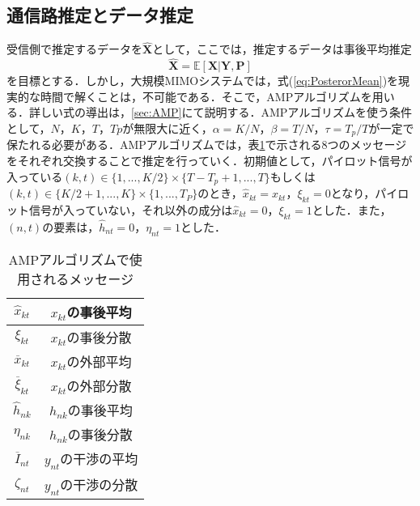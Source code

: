 \subsection{通信路推定とデータ推定}
受信側で推定するデータを$\hat{\boldsymbol{X}}$として，ここでは，推定するデータは事後平均推定
\begin{equation} 
	\label{eq:PosterorMean}
	\hat{\boldsymbol{X}}=\mathbb{E}[\boldsymbol{X}|\boldsymbol{Y},\boldsymbol{P}]
\end{equation}	
を目標とする．しかし，大規模MIMOシステムでは，式(\ref{eq:PosterorMean})を現実的な時間で解くことは，不可能である．そこで，AMPアルゴリズムを用いる．詳しい式の導出は，\ref{sec:AMP}にて説明する．AMPアルゴリズムを使う条件として，$N，K，T，Tp$が無限大に近く，$\alpha=K/N$，$\beta=T/N$，$\tau=T_{p}/T$が一定で保たれる必要がある．AMPアルゴリズムでは，表\ref{tb:Message}で示される8つのメッセージをそれぞれ交換することで推定を行っていく．初期値として，パイロット信号が入っている$(k,t) \in \{1,...,K/2\}\times \{T-T_{p}+1,...,T\}$もしくは$(k,t) \in \{K/2+1,...,K\}\times \{1,...,T_{P}\}$のとき，$\hat{x}_{kt}=x_{kt}$，$\xi_{kt}=0$となり，パイロット信号が入っていない，それ以外の成分は$\hat{x}_{kt}=0$，$\xi_{kt}=1$とした．また，$(n,t)$の要素は，$\hat{h}_{nt}=0$，$\eta_{nt}=1$とした．
\begin{table}[htb]
	\begin{center}
		\caption{AMPアルゴリズムで使用されるメッセージ \label{tb:Message}}
		\begin{tabular}{|c|c|} \hline
			$\hat{x}_{kt}$ & $x_{kt}$の事後平均 \\ \hline
			$\xi_{kt}$ & $x_{kt}$の事後分散 \\ \hline
			$\overline{x}_{kt}$ & $x_{kt}$の外部平均 \\ \hline
			$\overline{\xi}_{kt}$ & $x_{kt}$の外部分散 \\ \hline\hline
			$\hat{h}_{nk}$ & $h_{nk}$の事後平均 \\ \hline
			$\eta_{nk}$ & $h_{nk}$の事後分散 \\ \hline\hline
			$\overline{I}_{nt}$ & $y_{nt}$の干渉の平均 \\ \hline
			$\zeta_{nt}$ & $y_{nt}$の干渉の分散 \\ \hline
		\end{tabular}
	\end{center}
\end{table}

